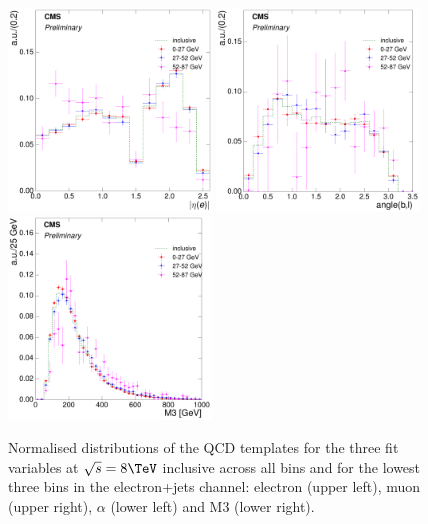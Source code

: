 \begin{figure}[hbtp]
    \centering
     \includegraphics[width=0.48\textwidth]{Chapters/04_Analysis/04b_XSections/images/8TeV/fit_variables/electron/MET/electron_absolute_eta/qcd/MET_electron_absolute_eta_0orMoreBtag_QCD_template_comparison.pdf}\hfill
     \includegraphics[width=0.48\textwidth]{Chapters/04_Analysis/04b_XSections/images/8TeV/fit_variables/electron/MET/angle_bl/qcd/MET_angle_bl_1orMoreBtag_QCD_template_comparison.pdf}\\
     \includegraphics[width=0.48\textwidth]{Chapters/04_Analysis/04b_XSections/images/8TeV/fit_variables/electron/MET/M3/qcd/MET_M3_0orMoreBtag_QCD_template_comparison.pdf}\\
	 \caption{Normalised distributions of the QCD templates for the three fit variables at $\sqrt{s}=8\TeV$
	 inclusive across all \met bins and for the lowest three \met bins in the electron+jets channel: electron
	 \abseta (upper left), muon \abseta (upper right), $\alpha$ (lower left) and M3 (lower right).}
     \label{fig:fit_variable_qcd_comparisons_8TeV}
\end{figure}

